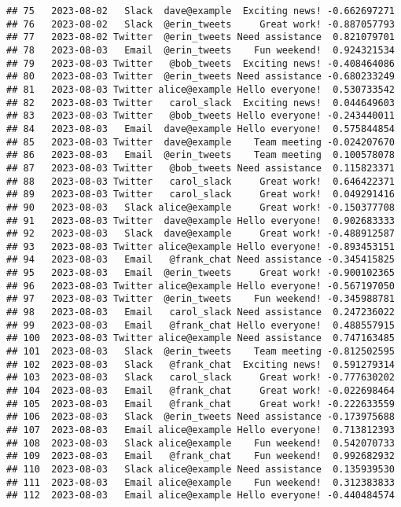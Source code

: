 \documentclass[
]{article}
\begin{document}
\begin{verbatim}
## 75   2023-08-02   Slack  dave@example  Exciting news! -0.662697271
## 76   2023-08-02   Slack  @erin_tweets     Great work! -0.887057793
## 77   2023-08-02 Twitter  @erin_tweets Need assistance  0.821079701
## 78   2023-08-03   Email  @erin_tweets    Fun weekend!  0.924321534
## 79   2023-08-03 Twitter   @bob_tweets  Exciting news! -0.408464086
## 80   2023-08-03 Twitter  @erin_tweets Need assistance -0.680233249
## 81   2023-08-03 Twitter alice@example Hello everyone!  0.530733542
## 82   2023-08-03 Twitter   carol_slack  Exciting news!  0.044649603
## 83   2023-08-03 Twitter   @bob_tweets Hello everyone! -0.243440011
## 84   2023-08-03   Email  dave@example Hello everyone!  0.575844854
## 85   2023-08-03 Twitter  dave@example    Team meeting -0.024207670
## 86   2023-08-03   Email  @erin_tweets    Team meeting  0.100578078
## 87   2023-08-03 Twitter   @bob_tweets Need assistance  0.115823371
## 88   2023-08-03 Twitter   carol_slack     Great work!  0.646422371
## 89   2023-08-03 Twitter   carol_slack     Great work!  0.049291416
## 90   2023-08-03   Slack alice@example     Great work! -0.150377708
## 91   2023-08-03 Twitter  dave@example Hello everyone!  0.902683333
## 92   2023-08-03   Slack  dave@example     Great work! -0.488912587
## 93   2023-08-03 Twitter alice@example Hello everyone! -0.893453151
## 94   2023-08-03   Email   @frank_chat Need assistance -0.345415825
## 95   2023-08-03   Email  @erin_tweets     Great work! -0.900102365
## 96   2023-08-03 Twitter alice@example Hello everyone! -0.567197050
## 97   2023-08-03 Twitter  @erin_tweets    Fun weekend! -0.345988781
## 98   2023-08-03   Email   carol_slack Need assistance  0.247236022
## 99   2023-08-03   Email   @frank_chat Hello everyone!  0.488557915
## 100  2023-08-03 Twitter alice@example Need assistance  0.747163485
## 101  2023-08-03   Slack  @erin_tweets    Team meeting -0.812502595
## 102  2023-08-03   Slack   @frank_chat  Exciting news!  0.591279314
## 103  2023-08-03   Slack   carol_slack     Great work! -0.777630202
## 104  2023-08-03   Email   @frank_chat     Great work! -0.022698464
## 105  2023-08-03   Email   @frank_chat     Great work! -0.222633559
## 106  2023-08-03   Slack  @erin_tweets Need assistance -0.173975688
## 107  2023-08-03   Email alice@example Hello everyone!  0.713812393
## 108  2023-08-03   Slack alice@example    Fun weekend!  0.542070733
## 109  2023-08-03   Email   @frank_chat    Fun weekend!  0.992682932
## 110  2023-08-03   Slack alice@example Need assistance  0.135939530
## 111  2023-08-03   Email alice@example    Fun weekend!  0.312383833
## 112  2023-08-03   Email alice@example Hello everyone! -0.440484574

\end{verbatim}
\end{document}
